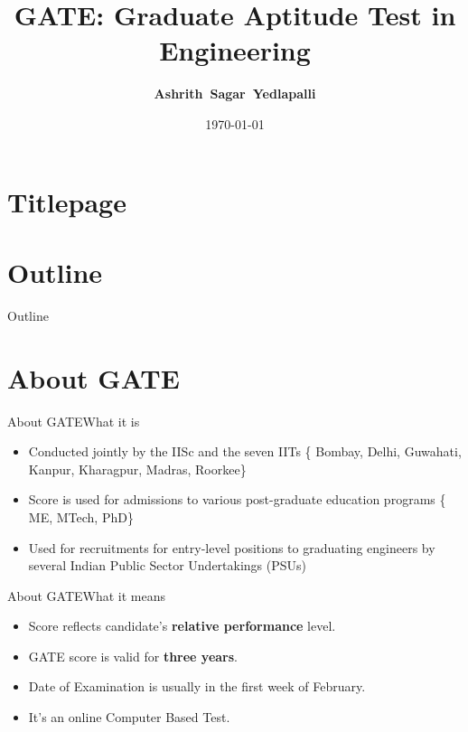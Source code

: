 \documentclass[handout]{beamer}
\title[GATE]{\textbf{GATE}: Graduate Aptitude Test in Engineering}
\author[Ashrith]{\textbf{Ashrith~Sagar~Yedlapalli}}
\institute[MIT]{Manipal Institute of Technology, Manipal}
\date{\today}
\begin{document}
\section*{Titlepage}
\begin{frame}
    \titlepage
\end{frame}

\section*{Outline}
\begin{frame}{Outline}
    \tableofcontents
\end{frame}

\section{About GATE}
\begin{frame}{About GATE}{What it is}
    \begin{itemize}
        \item Conducted jointly by the IISc and the seven IITs \{ Bombay, Delhi, Guwahati, Kanpur, Kharagpur, Madras, Roorkee\}
        \item Score is used for admissions to various post-graduate education programs \{ ME, MTech, PhD\}
        \item Used for recruitments for entry-level positions to graduating engineers by several Indian Public Sector Undertakings (PSUs)
    \end{itemize}
\end{frame}

\begin{frame}{About GATE}{What it means}
    \begin{itemize}
        \item Score reflects candidate's \textbf{relative performance} level.
        \item GATE score is valid for \textbf{three years}.
        \item Date of Examination is usually in the first week of February.
        \item It's an online Computer Based Test.
    \end{itemize}
\end{frame}
\end{document}
